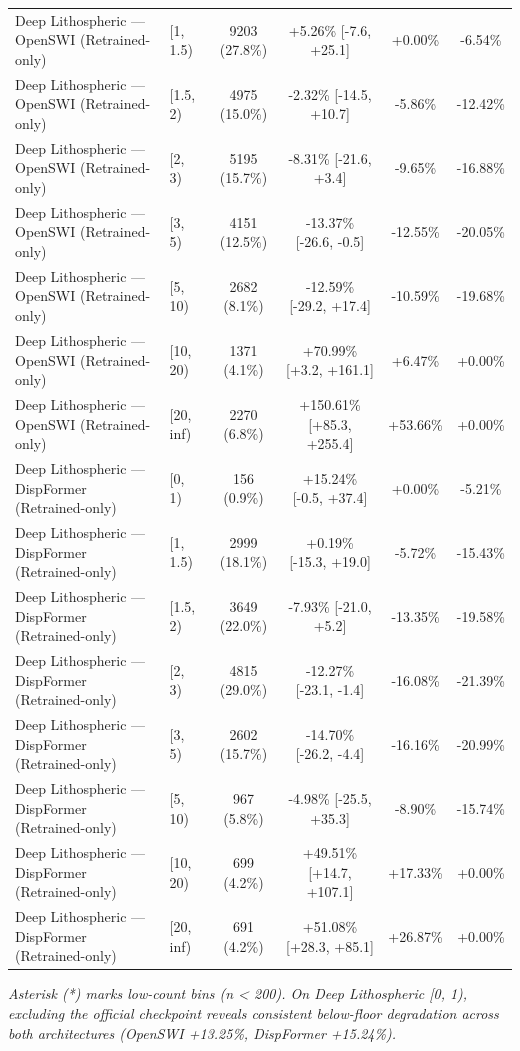 \begin{table}[t]
\begin{tabular}{llcccc}
Deep Lithospheric — OpenSWI (Retrained-only) & [1, 1.5) & 9203 (27.8\%) & +5.26\% [-7.6, +25.1] & +0.00\% & -6.54\% \\
Deep Lithospheric — OpenSWI (Retrained-only) & [1.5, 2) & 4975 (15.0\%) & -2.32\% [-14.5, +10.7] & -5.86\% & -12.42\% \\
Deep Lithospheric — OpenSWI (Retrained-only) & [2, 3) & 5195 (15.7\%) & -8.31\% [-21.6, +3.4] & -9.65\% & -16.88\% \\
Deep Lithospheric — OpenSWI (Retrained-only) & [3, 5) & 4151 (12.5\%) & -13.37\% [-26.6, -0.5] & -12.55\% & -20.05\% \\
Deep Lithospheric — OpenSWI (Retrained-only) & [5, 10) & 2682 (8.1\%) & -12.59\% [-29.2, +17.4] & -10.59\% & -19.68\% \\
Deep Lithospheric — OpenSWI (Retrained-only) & [10, 20) & 1371 (4.1\%) & +70.99\% [+3.2, +161.1] & +6.47\% & +0.00\% \\
Deep Lithospheric — OpenSWI (Retrained-only) & [20, inf) & 2270 (6.8\%) & +150.61\% [+85.3, +255.4] & +53.66\% & +0.00\% \\
Deep Lithospheric — DispFormer (Retrained-only) & [0, 1) & 156 (0.9\%) & +15.24\% [-0.5, +37.4] & +0.00\% & -5.21\% \\
Deep Lithospheric — DispFormer (Retrained-only) & [1, 1.5) & 2999 (18.1\%) & +0.19\% [-15.3, +19.0] & -5.72\% & -15.43\% \\
Deep Lithospheric — DispFormer (Retrained-only) & [1.5, 2) & 3649 (22.0\%) & -7.93\% [-21.0, +5.2] & -13.35\% & -19.58\% \\
Deep Lithospheric — DispFormer (Retrained-only) & [2, 3) & 4815 (29.0\%) & -12.27\% [-23.1, -1.4] & -16.08\% & -21.39\% \\
Deep Lithospheric — DispFormer (Retrained-only) & [3, 5) & 2602 (15.7\%) & -14.70\% [-26.2, -4.4] & -16.16\% & -20.99\% \\
Deep Lithospheric — DispFormer (Retrained-only) & [5, 10) & 967 (5.8\%) & -4.98\% [-25.5, +35.3] & -8.90\% & -15.74\% \\
Deep Lithospheric — DispFormer (Retrained-only) & [10, 20) & 699 (4.2\%) & +49.51\% [+14.7, +107.1] & +17.33\% & +0.00\% \\
Deep Lithospheric — DispFormer (Retrained-only) & [20, inf) & 691 (4.2\%) & +51.08\% [+28.3, +85.1] & +26.87\% & +0.00\% \\
\bottomrule
\end{tabular}
\par\vspace{2pt}\noindent\footnotesize{\textit{Asterisk (*) marks low-count bins (n < 200). On Deep Lithospheric [0, 1), excluding the official checkpoint reveals consistent below-floor degradation across both architectures (OpenSWI +13.25\%, DispFormer +15.24\%).}}
\end{table}
